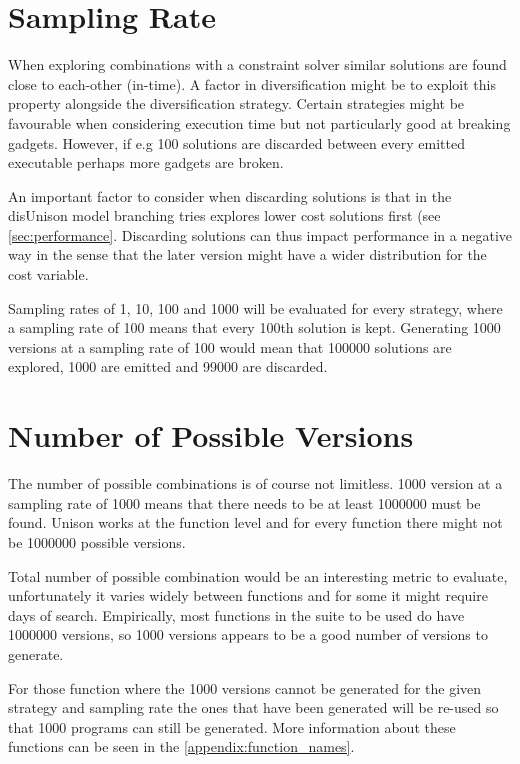 \section{Sampling Rate}
\label{sec:sampling_rate}

When exploring combinations with a constraint solver similar solutions are found close to
each-other (in-time). A factor in diversification might be to exploit this property
alongside the diversification strategy. Certain strategies might be favourable when
considering execution time but not particularly good at breaking gadgets. However, if
e.g 100 solutions are discarded between every emitted executable perhaps more gadgets are
broken.

An important factor to consider when discarding solutions is that in the disUnison model
branching tries explores lower cost solutions first (see \ref{sec:performance}.
Discarding solutions can thus impact performance in a negative way in the sense that the
later version might have a wider distribution for the cost variable.

Sampling rates of 1, 10, 100 and 1000 will be evaluated for every strategy, where a
sampling rate of 100 means that every 100th solution is kept. Generating 1000 versions
at a sampling rate of 100 would mean that 100000 solutions are explored, 1000 are emitted
and 99000 are discarded.

\section{Number of Possible Versions}

The number of possible combinations is of course not limitless. 1000 version at a sampling
rate of 1000 means that there needs to be at least 1000000 must be found. Unison works
at the function level and for every function there might not be 1000000 possible versions.

Total number of possible combination would be an interesting metric to evaluate, unfortunately
it varies widely between functions and for some it might require days of search. Empirically,
most functions in the suite to be used do have 1000000 versions, so 1000 versions appears
to be a good number of versions to generate.

For those function where the 1000 versions cannot be generated for the given strategy and
sampling rate the ones that have been generated will be re-used so that 1000 programs can
still be generated. More information about these functions can be seen in the
\ref{appendix:function_names}.


